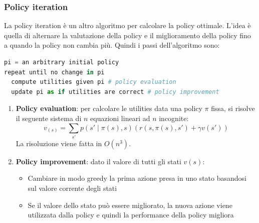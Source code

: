 \documentclass[a4paper]{article}
\begin{document}
\subsubsection{Policy iteration}
La policy iteration è un altro algoritmo per calcolare la policy ottimale. L'idea è
quella di alternare la valutazione della policy e il miglioramento della policy
fino a quando la policy non cambia più. Quindi i passi dell'algoritmo sono:
\begin{lstlisting}[language=Python]
pi = an arbitrary initial policy
repeat until no change in pi
  compute utilities given pi # policy evaluation
  update pi as if utilities are correct # policy improvement
\end{lstlisting}
\begin{enumerate}
  \item \textbf{Policy evaluation}: per calcolare le utilities data una policy \( \pi  \)
    fissa, si risolve il seguente sistema di \( n \) equazioni lineari ad \( n \) incognite:
    \[
      v_(s) = \sum_{s'} p(s' \;|\; \pi(s), s) \left( r(s, \pi(s), s') + \gamma v(s') \right)
    \] 
    La risoluzione viene fatta in \( O(n^3) \).

  \item \textbf{Policy improvement}: dato il valore di tutti gli stati \( v(s) \):
    \begin{itemize}
      \item Cambiare in modo greedy la prima azione presa in uno stato basandosi
        sul valore corrente degli stati
      \item Se il valore dello stato può essere migliorato, la nuova azione viene
        utilizzata dalla policy e quindi la performance della policy migliora
    \end{itemize}
\end{enumerate}
\end{document}
